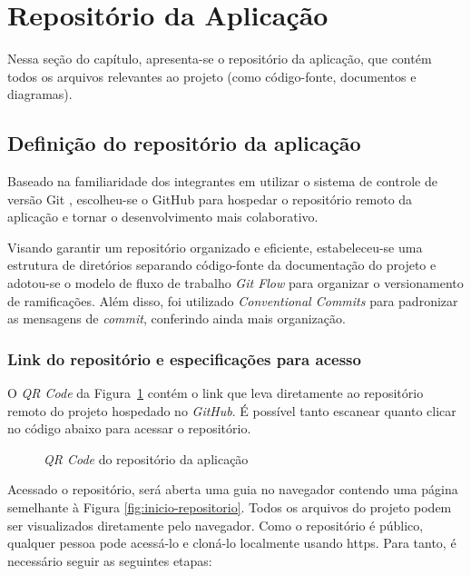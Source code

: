 \section{Repositório da Aplicação}

\label{section:repositorio-aplicacao}

Nessa seção do capítulo, apresenta-se o repositório da aplicação, que contém todos os arquivos relevantes ao projeto (como código-fonte, documentos e diagramas).

\subsection{Definição do repositório da aplicação}

Baseado na familiaridade dos integrantes em utilizar o sistema de controle de versão Git \cite{git-2025}, escolheu-se o GitHub \cite{github-2025} para hospedar o repositório remoto da aplicação e tornar o desenvolvimento mais colaborativo.

Visando garantir um repositório organizado e eficiente, estabeleceu-se uma estrutura de diretórios separando código-fonte da documentação do projeto e adotou-se o modelo de fluxo de trabalho \textit{Git Flow} \cite{gitflow-2023} para organizar o versionamento de ramificações. Além disso, foi utilizado \textit{Conventional Commits} \cite{convcommits-2025} para padronizar as mensagens de \textit{commit}, conferindo ainda mais organização.

\subsubsection{Link do repositório e especificações para acesso}

O \emph{QR Code} da Figura~\ref{fig:qrcode-repositorio} contém o link que leva diretamente ao repositório remoto do projeto hospedado no \emph{GitHub}. É possível tanto escanear quanto clicar no código abaixo para acessar o repositório.

\begin{figure}[h]
	\centering
		\caption{\emph{QR Code} do repositório da aplicação}
		\label{fig:qrcode-repositorio}
\end{figure}

Acessado o repositório, será aberta uma guia no navegador contendo uma página semelhante à Figura \ref{fig:inicio-repositorio}. Todos os arquivos do projeto podem ser visualizados diretamente pelo navegador. Como o repositório é público, qualquer pessoa pode acessá-lo e cloná-lo localmente usando \gls{https}. Para tanto, é necessário seguir as seguintes etapas:
 
